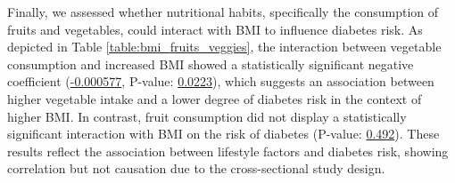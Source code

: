 \documentclass[11pt]{article}
\begin{document}
Finally, we assessed whether nutritional habits, specifically the consumption of fruits and vegetables, could interact with BMI to influence diabetes risk. As depicted in Table \ref{table:bmi_fruits_veggies}, the interaction between vegetable consumption and increased BMI showed a statistically significant negative coefficient (\hyperlink{D6a}{-0.000577}, P-value: \hyperlink{D6d}{0.0223}), which suggests an association between higher vegetable intake and a lower degree of diabetes risk in the context of higher BMI. In contrast, fruit consumption did not display a statistically significant interaction with BMI on the risk of diabetes (P-value: \hyperlink{D4d}{0.492}). These results reflect the association between lifestyle factors and diabetes risk, showing correlation but not causation due to the cross-sectional study design.
\end{document}
